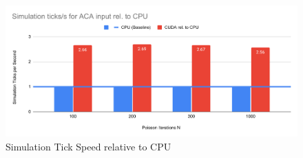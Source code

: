 \begin{figure}
    \centering
    \includegraphics[width=\linewidth]{Ch62Results/figures/temp_ticks_per_second_vs_iters_rel_cpu_aca.pdf}
    \caption{Simulation Tick Speed relative to CPU}
    \label{fig:results:ticks_per_second_bar_rel_cpu_aca}
\end{figure}